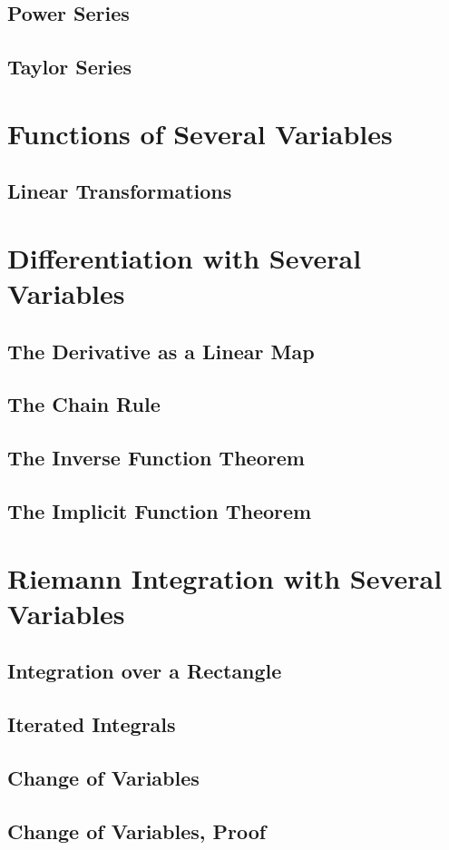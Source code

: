 \documentclass{article}
\theoremstyle{definition}
\begin{document}
\subsection{Power Series}
\subsection{Taylor Series}
\section{Functions of Several Variables}
\subsection{Linear Transformations}
\section{Differentiation with Several Variables}
\subsection{The Derivative as a Linear Map}
\subsection{The Chain Rule}
\subsection{The Inverse Function Theorem}
\subsection{The Implicit Function Theorem}
\section{Riemann Integration with Several Variables}
\subsection{Integration over a Rectangle}
\subsection{Iterated Integrals}
\subsection{Change of Variables}
\subsection{Change of Variables, Proof}
\end{document}
